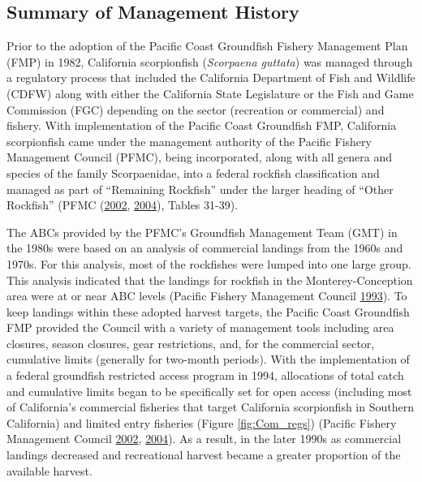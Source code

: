 \documentclass[12pt,]{article}
\begin{document}
\subsection{Summary of Management
History}\label{summary-of-management-history}

Prior to the adoption of the Pacific Coast Groundfish Fishery Management
Plan (FMP) in 1982, California scorpionfish (\emph{Scorpaena guttata})
was managed through a regulatory process that included the California
Department of Fish and Wildlife (CDFW) along with either the California
State Legislature or the Fish and Game Commission (FGC) depending on the
sector (recreation or commercial) and fishery. With implementation of
the Pacific Coast Groundfish FMP, California scorpionfish came under the
management authority of the Pacific Fishery Management Council (PFMC),
being incorporated, along with all genera and species of the family
Scorpaenidae, into a federal rockfish classification and managed as part
of ``Remaining Rockfish'' under the larger heading of ``Other Rockfish''
(PFMC (\protect\hyperlink{ref-PFMC2002}{2002},
\protect\hyperlink{ref-PFMC2004}{2004}), Tables 31-39).

The ABCs provided by the PFMC's Groundfish Management Team (GMT) in the
1980s were based on an analysis of commercial landings from the 1960s
and 1970s. For this analysis, most of the rockfishes were lumped into
one large group. This analysis indicated that the landings for rockfish
in the Monterey-Conception area were at or near ABC levels (Pacific
Fishery Management Council \protect\hyperlink{ref-PFMC1993}{1993}). To
keep landings within these adopted harvest targets, the Pacific Coast
Groundfish FMP provided the Council with a variety of management tools
including area closures, season closures, gear restrictions, and, for
the commercial sector, cumulative limits (generally for two-month
periods). With the implementation of a federal groundfish restricted
access program in 1994, allocations of total catch and cumulative limits
began to be specifically set for open access (including most of
California's commercial fisheries that target California scorpionfish in
Southern California) and limited entry fisheries (Figure
\ref{fig:Com_regs}) (Pacific Fishery Management Council
\protect\hyperlink{ref-PFMC2002}{2002},
\protect\hyperlink{ref-PFMC2004}{2004}). As a result, in the later 1990s
as commercial landings decreased and recreational harvest became a
greater proportion of the available harvest.
\end{document}
